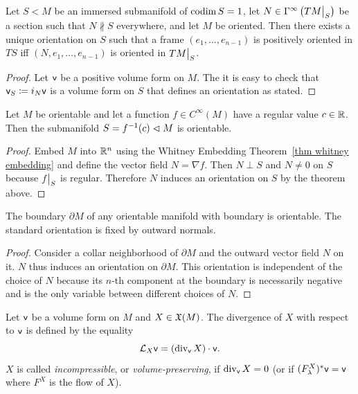 \begin{thm}\label{thm orientation via normal vector}
Let $S<M$ be an immersed submanifold of $\operatorname{codim} S=1$, let $N\in\Gamma^\infty\left(\restr{TM}{S}\right)$ be a section such that $N\not\parallel S$ everywhere, and let $M$ be oriented. Then there exists a unique orientation on $S$ such that a frame $(e_1,\ldots,e_{n-1})$ is positively oriented in $TS$ iff $(N,e_1,\ldots,e_{n-1})$ is oriented in $\restr{TM}{S}$.
\end{thm}
\begin{proof}
Let $\mathsf{v}$ be a positive volume form on $M$. The it is easy to check that $\mathsf{v}_S\coloneqq i_N \mathsf{v}$ is a volume form on $S$ that defines an orientation as stated.
\end{proof}
\begin{cor}
Let $M$ be orientable and let a function $f\in C^\infty(M)$ have a regular value $c\in \mathbb{R} $. Then the submanifold $S=f^{-1}(c)\vartriangleleft M$ is orientable.
\end{cor}
\begin{proof}
Embed $M$ into $\mathbb{R}^n$ using the Whitney Embedding Theorem~\ref{thm whitney embedding} and define the vector field $N=\nabla f$. Then $N\perp S$ and $N\neq 0$ on $S$ because $\restr{f}{S}$ is regular. Therefore $N$ induces an orientation on $S$ by the theorem above.
\end{proof}
\begin{cor}
The boundary $\partial M$ of any orientable manifold with boundary is orientable. The standard orientation is fixed by outward normals.
\end{cor}
\begin{proof}
Consider a collar neighborhood of $\partial M$ and the outward vector field $N$ on it. $N$ thus induces an orientation on $\partial M$. This orientation is independent of the choice of $N$ because its $n$-th component at the boundary is necessarily negative and is the only variable between different choices of $N$.
\end{proof}


\begin{defn}
Let $\mathsf{v}$ be a volume form on $M$ and $X\in \mathfrak{X}(M)$. The divergence of $X$ with respect to $\mathsf{v}$ is defined by the equality
\[\mathcal{L}_X\mathsf{v} =(\operatorname{div}_{\mathsf{v}} X)\cdot \mathsf{v}.\]
$X$ is called \emph{incompressible}, or \emph{volume-preserving}, if $\operatorname{div}_{\mathsf{v}} X=0$ (or if $(F^X_\lambda)^\ast\mathsf{v}=\mathsf{v}$ where $F^X$ is the flow of $X$).
\end{defn}


